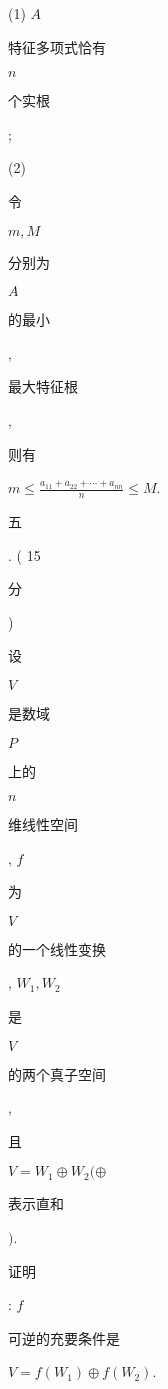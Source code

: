 \documentclass[10pt]{article}
\begin{document}
(1) $A$ \begin{CJK}{UTF8}{mj}特征多项式恰有\end{CJK} $n$ \begin{CJK}{UTF8}{mj}个实根\end{CJK};

(2) \begin{CJK}{UTF8}{mj}令\end{CJK} $m, M$ \begin{CJK}{UTF8}{mj}分别为\end{CJK} $A$ \begin{CJK}{UTF8}{mj}的最小\end{CJK}, \begin{CJK}{UTF8}{mj}最大特征根\end{CJK}, \begin{CJK}{UTF8}{mj}则有\end{CJK} $m \leqslant \frac{a_{11}+a_{22}+\cdots+a_{n n}}{n} \leqslant M$.

\begin{CJK}{UTF8}{mj}五\end{CJK}. ( 15 \begin{CJK}{UTF8}{mj}分\end{CJK}) \begin{CJK}{UTF8}{mj}设\end{CJK} $V$ \begin{CJK}{UTF8}{mj}是数域\end{CJK} $P$ \begin{CJK}{UTF8}{mj}上的\end{CJK} $n$ \begin{CJK}{UTF8}{mj}维线性空间\end{CJK}, $f$ \begin{CJK}{UTF8}{mj}为\end{CJK} $V$ \begin{CJK}{UTF8}{mj}的一个线性变换\end{CJK}, $W_{1}, W_{2}$ \begin{CJK}{UTF8}{mj}是\end{CJK} $V$ \begin{CJK}{UTF8}{mj}的两个真子空间\end{CJK}, \begin{CJK}{UTF8}{mj}且\end{CJK} $V=W_{1} \oplus W_{2}(\oplus$ \begin{CJK}{UTF8}{mj}表示直和\end{CJK} $)$. \begin{CJK}{UTF8}{mj}证明\end{CJK}: $f$ \begin{CJK}{UTF8}{mj}可逆的充要条件是\end{CJK} $V=f\left(W_{1}\right) \oplus f\left(W_{2}\right)$.
\end{document}
